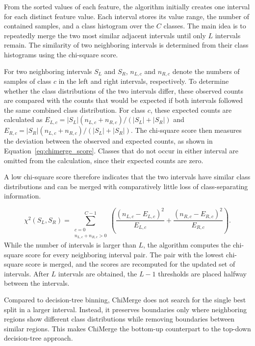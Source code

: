             From the sorted values of each feature, the algorithm initially creates one interval for each distinct feature value. Each interval stores its value range, the number of contained samples, and a class histogram over the $C$ classes. The main idea is to repeatedly merge the two most similar adjacent intervals until only $L$ intervals remain. The similarity of two neighboring intervals is determined from their class histograms using the chi-square score.

            
            For two neighboring intervals $S_L$ and $S_R$, $n_{L,c}$ and $n_{R,c}$ denote the numbers of samples of class \(c\) in the left and right intervals, respectively. To determine whether the class distributions of the two intervals differ, these observed counts are compared with the counts that would be expected if both intervals followed the same combined class distribution. For class $c$, these expected counts are calculated as $E_{L,c}=|S_L|(n_{L,c}+n_{R,c})/(|S_L|+|S_R|)$ and $E_{R,c}=|S_R|(n_{L,c}+n_{R,c})/(|S_L|+|S_R|)$.
            The chi-square score then measures the deviation between the observed and expected counts, as shown in Equation~\ref{eq:chimerge_score}. Classes that do not occur in either interval are omitted from the calculation, since their expected counts are zero.
            
            A low chi-square score therefore indicates that the two intervals have similar class distributions and can be merged with comparatively little loss of class-separating information.
        

                \begin{equation}
                \chi^2(S_L,S_R)
                =
                \sum_{\substack{c=0\\n_{L,c}+n_{R,c}>0}}^{C-1}
                \left(
                \frac{(n_{L,c}-E_{L,c})^2}{E_{L,c}}
                +
                \frac{(n_{R,c}-E_{R,c})^2}{E_{R,c}}
                \right).
                \label{eq:chimerge_score}
                \end{equation}
            While the number of intervals is larger than $L$, the algorithm computes the chi-square score for every neighboring interval pair. The pair with the lowest chi-square score is merged, and the scores are recomputed for the updated set of intervals. After $L$ intervals are obtained, the $L-1$ thresholds are placed halfway between the intervals.
            
            Compared to decision-tree binning, ChiMerge does not search for the single best split in a larger interval. Instead, it preserves boundaries only where neighboring regions show different class distributions while removing boundaries between similar regions. This makes ChiMerge the bottom-up counterpart to the top-down decision-tree approach.\\
            

